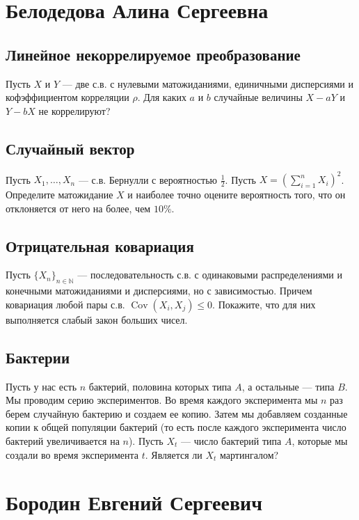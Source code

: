 \documentclass[12pt]{article}
\newcommand\N{\mathbb{N}}
\DeclareMathOperator{\Cov}{Cov}
\begin{document}

\section{Белодедова Алина Сергеевна}

\subsection{Линейное некоррелируемое преобразование}

Пусть $X$ и $Y$ --- две с.в. с нулевыми матожиданиями, единичными дисперсиями и кофэффициентом корреляции $\rho$. Для каких $a$ и $b$ случайные величины $X - aY$ и $Y - bX$ не коррелируют?


\subsection{Случайный вектор}

Пусть $X_1, \dots, X_n$ --- с.в. Бернулли с вероятностью $\frac{1}{2}$. Пусть $X = (\sum_{i = 1}^n X_i)^2$. Определите матожидание $X$ и наиболее точно оцените вероятность того, что он отклоняется от него на более, чем $10\%$.


\subsection{Отрицательная ковариация}

Пусть $\{X_n\}_{n \in \N}$ --- последовательность с.в. с одинаковыми распределениями и конечными матожиданиями и дисперсиями, но с зависимостью. Причем ковариация любой пары с.в. $\Cov(X_i, X_j) \le 0$. Покажите, что для них выполняется слабый закон больших чисел.


\subsection{Бактерии}

Пусть у нас есть $n$ бактерий, половина которых типа $A$, а остальные --- типа $B$. Мы проводим серию экспериментов. Во время каждого эксперимента мы $n$ раз берем случайную бактерию и создаем ее копию. Затем мы добавляем созданные копии к общей популяции бактерий (то есть после каждого эксперимента число бактерий увеличивается на $n$). Пусть $X_t$ --- число бактерий типа $A$, которые мы создали во время эксперимента $t$. Является ли $X_t$ мартингалом?


\newpage
\section{Бородин Евгений Сергеевич}
\end{document}
